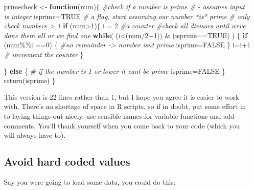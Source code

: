 \documentclass[
  12pt,
  a5paper,
]{book}
\newenvironment{Shaded}{\begin{snugshade}}{\end{snugshade}}
\newcommand{\CommentTok}[1]{\textcolor[rgb]{0.56,0.35,0.01}{\textit{#1}}}
\newcommand{\ConstantTok}[1]{\textcolor[rgb]{0.00,0.00,0.00}{#1}}
\newcommand{\ControlFlowTok}[1]{\textcolor[rgb]{0.13,0.29,0.53}{\textbf{#1}}}
\newcommand{\DecValTok}[1]{\textcolor[rgb]{0.00,0.00,0.81}{#1}}
\newcommand{\FunctionTok}[1]{\textcolor[rgb]{0.00,0.00,0.00}{#1}}
\newcommand{\NormalTok}[1]{#1}
\newcommand{\OtherTok}[1]{\textcolor[rgb]{0.56,0.35,0.01}{#1}}
\newcommand{\SpecialCharTok}[1]{\textcolor[rgb]{0.00,0.00,0.00}{#1}}
\begin{document}
\begin{Shaded}
\begin{Highlighting}[]
\NormalTok{primecheck }\OtherTok{\textless{}{-}} \ControlFlowTok{function}\NormalTok{(num)\{}
  \CommentTok{\#check if a number is prime}
  \CommentTok{\# {-} assumes input is integer}
\NormalTok{  isprime}\OtherTok{=}\ConstantTok{TRUE} \CommentTok{\# a flag, start assuming our number *is* prime }
  \CommentTok{\# only check numbers \textgreater{} 1}
  \ControlFlowTok{if}\NormalTok{ (num}\SpecialCharTok{\textgreater{}}\DecValTok{1}\NormalTok{)\{ }
\NormalTok{    i }\OtherTok{=} \DecValTok{2} \CommentTok{\#a counter}
      \CommentTok{\#check all divisors until we\textquotesingle{}ve done them all or we find one }
\ControlFlowTok{while}\NormalTok{( (i}\SpecialCharTok{\textless{}}\NormalTok{(num}\SpecialCharTok{/}\DecValTok{2}\SpecialCharTok{+}\DecValTok{1}\NormalTok{)) }\SpecialCharTok{\&}\NormalTok{ (isprime}\SpecialCharTok{==}\ConstantTok{TRUE}\NormalTok{) ) \{}
  \ControlFlowTok{if}\NormalTok{ (num}\SpecialCharTok{\%\%}\NormalTok{i }\SpecialCharTok{==}\DecValTok{0}\NormalTok{) \{}
    \CommentTok{\#no remainder {-}\textgreater{} number isn\textquotesingle{}t prime}
\NormalTok{    isprime}\OtherTok{=}\ConstantTok{FALSE}
\NormalTok{  \}}
\NormalTok{  i}\OtherTok{=}\NormalTok{i}\SpecialCharTok{+}\DecValTok{1} \CommentTok{\# increment the counter}
\NormalTok{\}}

\NormalTok{\} }\ControlFlowTok{else}\NormalTok{ \{}
  \CommentTok{\# if the number is 1 or lower it can\textquotesingle{}t be prime}
\NormalTok{  isprime}\OtherTok{=}\ConstantTok{FALSE}
\NormalTok{\}}
\FunctionTok{return}\NormalTok{(isprime)}
\NormalTok{\}}
\end{Highlighting}
\end{Shaded}

This version is 22 lines rather than 1, but I hope you agree it is easier to work with. There's no shortage of space in R scripts, so if in doubt, put some effort in to laying things out nicely, use sensible names for variable functions and add comments. You'll thank yourself when you come back to your code (which you will always have to).

\hypertarget{avoid-hard-coded-values}{%
\subsection{Avoid hard coded values}\label{avoid-hard-coded-values}}

Say you were going to load some data, you could do this:
\end{document}
